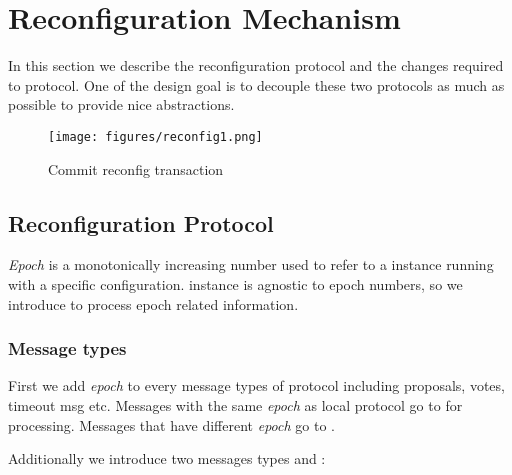 \section{Reconfiguration Mechanism} \label{mechanism}

In this section we describe the reconfiguration protocol and the changes required to \LBFT protocol.
One of the design goal is to decouple these two protocols as much as possible to provide nice abstractions.
\begin{figure}[h]
			\centering
		\texttt{[image: figures/reconfig1.png]}
	\caption{Commit reconfig transaction}
\end{figure}

\subsection{Reconfiguration Protocol}

\emph{Epoch} is a monotonically increasing number used to refer to a \LBFT instance running with a specific configuration.
\LBFT instance is agnostic to epoch numbers, so we introduce  to process epoch related information.

\subsubsection{Message types}

First we add \emph{epoch} to every message types of \LBFT protocol including proposals, votes, timeout msg etc. Messages
with the same \emph{epoch} as local \LBFT protocol go to \LBFT for processing. Messages that have different \emph{epoch}
go to .

Additionally we introduce two messages types  and :

\begin{algorithm}[H]
\myalgorithm
{\SetAlgoNoLine
{}

\BlankLine
{}

\BlankLine
{}
}
\end{algorithm}

